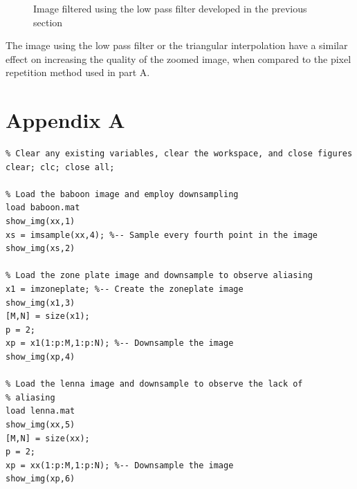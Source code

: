 \documentclass{article}
\begin{document}
\begin{figure}[H]
\begin{minipage}[t][][b]{0.48\linewidth}
		\caption{Image filtered using the low pass filter developed in the previous section}
	\end{minipage}
\end{figure} 

The image using the low pass filter or the triangular interpolation have a similar effect on increasing the quality of the zoomed image, when compared to the pixel repetition method used in part A.

\newpage

\section{Appendix A}
\begin{lstlisting}
% Clear any existing variables, clear the workspace, and close figures
clear; clc; close all;

% Load the baboon image and employ downsampling
load baboon.mat
show_img(xx,1)
xs = imsample(xx,4); %-- Sample every fourth point in the image
show_img(xs,2)

% Load the zone plate image and downsample to observe aliasing
x1 = imzoneplate; %-- Create the zoneplate image
show_img(x1,3)
[M,N] = size(x1);
p = 2;
xp = x1(1:p:M,1:p:N); %-- Downsample the image
show_img(xp,4)

% Load the lenna image and downsample to observe the lack of
% aliasing
load lenna.mat
show_img(xx,5)
[M,N] = size(xx);
p = 2;
xp = xx(1:p:M,1:p:N); %-- Downsample the image
show_img(xp,6)
\end{lstlisting}

\newpage
\end{document}
